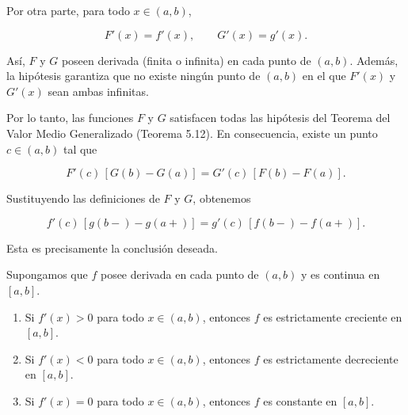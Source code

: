 \begin{prueba}
Por otra parte, para todo $x\in(a,b)$,

\[
F'(x)=f'(x),
\qquad
G'(x)=g'(x).
\]

Así, $F$ y $G$ poseen derivada (finita o infinita) en cada punto de $(a,b)$. Además, la hipótesis garantiza que no existe ningún punto de $(a,b)$ en el que $F'(x)$ y $G'(x)$ sean ambas infinitas.

Por lo tanto, las funciones $F$ y $G$ satisfacen todas las hipótesis del Teorema del Valor Medio Generalizado (Teorema 5.12). En consecuencia, existe un punto $c\in(a,b)$ tal que

\[
F'(c)\,[G(b)-G(a)]
=
G'(c)\,[F(b)-F(a)].
\]

Sustituyendo las definiciones de $F$ y $G$, obtenemos

\[
f'(c)\,[g(b-)-g(a+)]
=
g'(c)\,[f(b-)-f(a+)].
\]

Esta es precisamente la conclusión deseada.

\end{prueba}

\begin{teorema}
    Supongamos que $f$ posee derivada en cada punto de $(a,b)$ y es continua en
$[a,b]$.

\begin{enumerate}[label=\alph*)]

\item Si $f'(x)>0$ para todo $x\in(a,b)$, entonces $f$ es estrictamente creciente en $[a,b]$.

\item Si $f'(x)<0$ para todo $x\in(a,b)$, entonces $f$ es estrictamente decreciente en $[a,b]$.

\item Si $f'(x)=0$ para todo $x\in(a,b)$, entonces $f$ es constante en $[a,b]$.

\end{enumerate}

\end{teorema}

